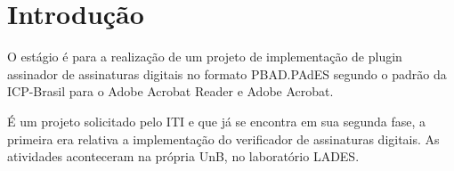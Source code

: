 \chapter[Introdução]{Introdução}

O estágio é para a realização de um projeto de implementação de plugin assinador de assinaturas digitais no formato PBAD.PAdES segundo
o padrão da ICP-Brasil para o Adobe Acrobat Reader e Adobe Acrobat.

É um projeto solicitado pelo ITI e que já se encontra em sua segunda fase, a primeira era relativa a implementação do verificador de assinaturas digitais.
As atividades aconteceram na própria UnB, no laboratório LADES.
